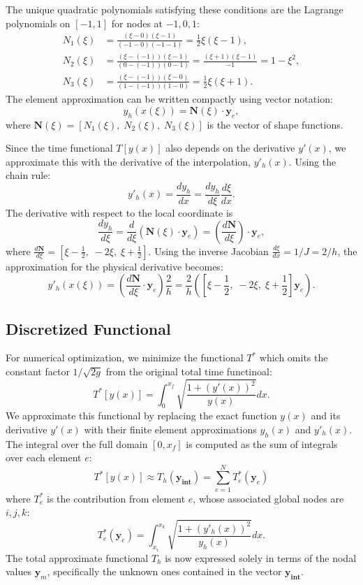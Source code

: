 \documentclass[12pt]{article}
\begin{document}
    The unique quadratic polynomials satisfying these conditions are the Lagrange polynomials on \([-1, 1]\) for nodes at \(-1, 0, 1\):
    \[
    \begin{aligned}
        N_1(\xi) &= \frac{(\xi - 0)(\xi - 1)}{(-1 - 0)(-1 - 1)} = \frac{1}{2}\xi(\xi-1), \\
        N_2(\xi) &= \frac{(\xi - (-1))(\xi - 1)}{(0 - (-1))(0 - 1)} = \frac{(\xi+1)(\xi-1)}{-1} = 1 - \xi^2 ,\\
        N_3(\xi) &= \frac{(\xi - (-1))(\xi - 0)}{(1 - (-1))(1 - 0)} = \frac{1}{2}\xi(\xi+1).
    \end{aligned}
    \]
    The element approximation can be written compactly using vector notation:
    \[
        y_h\left(x(\xi)\right) = \mathbf{N}(\xi) \cdot \mathbf{y}_e,
    \]
    where \( \mathbf{N}(\xi) = [N_1(\xi), \; N_2(\xi), \; N_3(\xi)] \) is the vector of shape functions.
    
    Since the time functional \( T[y(x)] \) also depends on the derivative \( y'(x) \), we approximate this with the derivative of the interpolation, \( y'_h (x) \). Using the chain rule:
    \[
        y'_h (x) = \frac{dy_h}{dx}  = \frac{dy_h}{d\xi} \frac{d\xi}{dx}.
    \]
    The derivative with respect to the local coordinate is
    \[
        \frac{dy_h}{d\xi} = \frac{d}{d\xi} (\mathbf{N}(\xi) \cdot \mathbf{y}_e) = \left( \frac{d\mathbf{N}}{d\xi} \right) \cdot \mathbf{y}_e,
    \]
    where \( \frac{d\mathbf{N}}{d\xi} = \left[ \xi - \frac{1}{2},\; -2\xi,\; \xi + \frac{1}{2} \right] \).
    Using the inverse Jacobian \( \frac{d\xi}{dx} = 1/J = 2/h \), the approximation for the physical derivative becomes:
    \[
        y'_h(x(\xi)) = \left( \frac{d\mathbf{N}}{d\xi} \cdot \mathbf{y}_e \right) \frac{2}{h} = \frac{2}{h} \left( \left[ \xi - \frac{1}{2},\; -2\xi,\; \xi + \frac{1}{2} \right] \mathbf{y}_e \right).
    \]
    
\subsection{Discretized Functional}
    
    For numerical optimization, we minimize the functional \( T^* \) which omits the constant factor \( 1/\sqrt{2g} \) from the original total time functinoal:
    \[
        T^*[y(x)] = \int_0^{x_f} \sqrt{\frac{1 + (y'(x))^2}{y(x)}} dx .
    \]
    We approximate this functional by replacing the exact function \( y(x) \) and its derivative \( y'(x) \) with their finite element approximations \( y_h (x) \) and \( y'_h (x) \). The integral over the full domain \( [0, x_f] \) is computed as the sum of integrals over each element \(e\):
    \[
        T^*[y(x)] \approx T_h(\mathbf{y_\text{int}}) = \sum_{e=1}^{N} T_e^*(\mathbf{y}_e)
    \]
    where \( T_e^* \) is the contribution from element \(e\), whose associated global nodes are \(i, j, k\):
    \[
        T_e^*(\mathbf{y}_e) = \int_{x_{i}}^{x_{k}} \sqrt{\frac{1 + (y'_h(x))^2}{y_h(x)}} dx.
    \]
    The total approximate functional \( T_h \) is now expressed solely in terms of the nodal values \(\mathbf{y}_m\), specifically the unknown ones contained in the vector \(\mathbf{y_\text{int}}\). 
\end{document}
